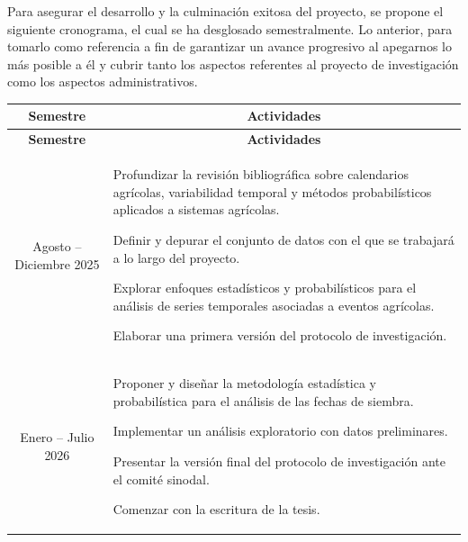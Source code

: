Para asegurar el desarrollo y la culminación exitosa del proyecto, se propone el siguiente cronograma, el cual se ha desglosado semestralmente. Lo anterior, para tomarlo como referencia a fin de garantizar un avance progresivo al apegarnos lo más posible a él y cubrir tanto los aspectos referentes al proyecto de investigación como los aspectos administrativos.\\

\begin{longtable}{|c|p{}|} 
	\hline
	\textbf{Semestre} & \multicolumn{1}{c|}{\textbf{Actividades}} \\ 
	\hline
	\endfirsthead
	
	\hline
	\textbf{Semestre} & \multicolumn{1}{c|}{\textbf{Actividades}} \\ 
	\hline
	\endhead
	
	\centering Agosto -- Diciembre 2025 & 
	
	\begin{list}{\textbullet}{%
			\setlength{\leftmargin}{0.2cm}%
			\addtolength{\topsep}{-1.1cm}%
			\addtolength{\labelsep}{-2mm}%
			\addtolength{\itemsep}{-2mm}%
			\setlength{\itemindent}{0cm}}
		\item Profundizar la revisión bibliográfica sobre calendarios agrícolas, variabilidad temporal y métodos probabilísticos aplicados a sistemas agrícolas.
		\item Definir y depurar el conjunto de datos con el que se trabajará a lo largo del proyecto.
		\item Explorar enfoques estadísticos y probabilísticos para el análisis de series temporales asociadas a eventos agrícolas.
		\item Elaborar una primera versión del protocolo de investigación.
	\end{list} \\ \hline
	
	\centering Enero -- Julio 2026      & 
	\begin{list}{\textbullet}{%
			\setlength{\leftmargin}{0.2cm}%
			\addtolength{\topsep}{-1.1cm}%
			\addtolength{\labelsep}{-2mm}%
			\addtolength{\itemsep}{-2mm}%
			\setlength{\itemindent}{0cm}}
		\item Proponer y diseñar la metodología estadística y probabilística para el análisis de las fechas de siembra.
		\item Implementar un análisis exploratorio con datos preliminares.
		\item Presentar la versión final del protocolo de investigación ante el comité sinodal.
		\item Comenzar con la escritura de la tesis.
	\end{list} \\ \hline
	

\end{longtable}
